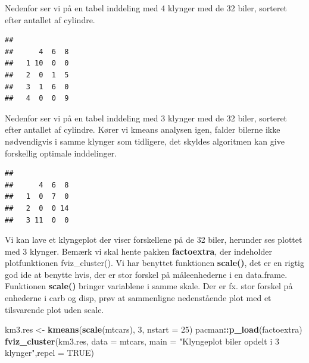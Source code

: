 \documentclass[]{book}
\newenvironment{Shaded}{\begin{snugshade}}{\end{snugshade}}
\newcommand{\DataTypeTok}[1]{\textcolor[rgb]{0.13,0.29,0.53}{#1}}
\newcommand{\DecValTok}[1]{\textcolor[rgb]{0.00,0.00,0.81}{#1}}
\newcommand{\KeywordTok}[1]{\textcolor[rgb]{0.13,0.29,0.53}{\textbf{#1}}}
\newcommand{\NormalTok}[1]{#1}
\newcommand{\OperatorTok}[1]{\textcolor[rgb]{0.81,0.36,0.00}{\textbf{#1}}}
\newcommand{\OtherTok}[1]{\textcolor[rgb]{0.56,0.35,0.01}{#1}}
\newcommand{\StringTok}[1]{\textcolor[rgb]{0.31,0.60,0.02}{#1}}
\begin{document}
Nedenfor ser vi på en tabel inddeling med 4 klynger med de 32 biler, sorteret efter antallet af cylindre.

\begin{Shaded}
\end{Shaded}

\begin{verbatim}
##    
##      4  6  8
##   1 10  0  0
##   2  0  1  5
##   3  1  6  0
##   4  0  0  9
\end{verbatim}

Nedenfor ser vi på en tabel inddeling med 3 klynger med de 32 biler, sorteret efter antallet af cylindre. Kører vi kmeans analysen igen, falder bilerne ikke nødvendigvis i samme klynger som tidligere, det skyldes algoritmen kan give forskellig optimale inddelinger.

\begin{Shaded}
\end{Shaded}

\begin{verbatim}
##    
##      4  6  8
##   1  0  7  0
##   2  0  0 14
##   3 11  0  0
\end{verbatim}

Vi kan lave et klyngeplot der viser forskellene på de 32 biler, herunder ses plottet med 3 klynger. Bemærk vi skal hente pakken \textbf{factoextra}, der indeholder plotfunktionen fviz\_cluster(). Vi har benyttet funktionen \textbf{scale()}, det er en rigtig god ide at benytte hvis, der er stor forskel på måleenhederne i en data.frame. Funktionen \textbf{scale()} bringer variablene i samme skale. Der er fx. stor forskel på enhederne i carb og disp, prøv at sammenligne nedenstående plot med et tilsvarende plot uden scale.

\begin{Shaded}
\begin{Highlighting}[]
\NormalTok{km3.res <-}\StringTok{ }\KeywordTok{kmeans}\NormalTok{(}\KeywordTok{scale}\NormalTok{(mtcars), }\DecValTok{3}\NormalTok{, }\DataTypeTok{nstart =} \DecValTok{25}\NormalTok{)}
\NormalTok{pacman}\OperatorTok{::}\KeywordTok{p_load}\NormalTok{(factoextra)}
\KeywordTok{fviz_cluster}\NormalTok{(km3.res, }\DataTypeTok{data =}\NormalTok{ mtcars, }\DataTypeTok{main =} \StringTok{"Klyngeplot biler opdelt i 3 klynger"}\NormalTok{,}\DataTypeTok{repel =} \OtherTok{TRUE}\NormalTok{)}
\end{Highlighting}
\end{Shaded}
\end{document}
